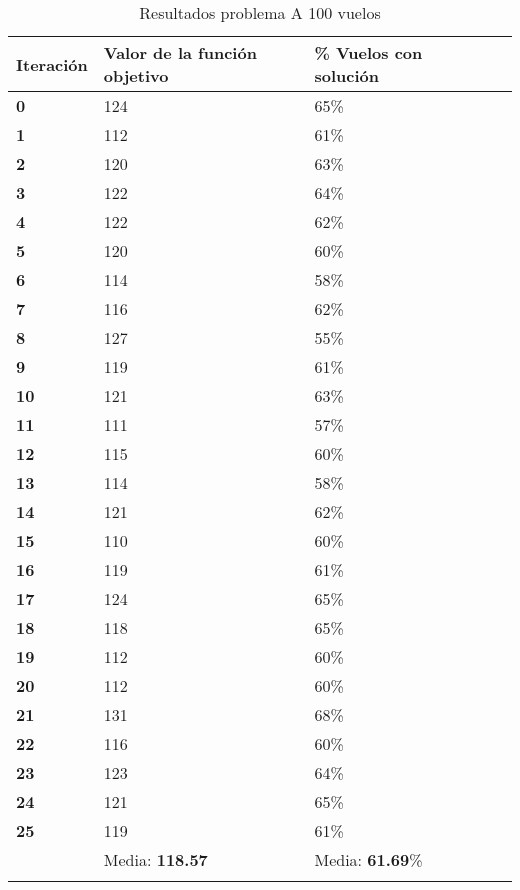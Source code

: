 \begin{longtable}{| p{} | p{} |  p{} | p{}  | p{} | }
	\hline
	\textbf{Iteración} & \textbf{Valor de la función objetivo} &\textbf{\% Vuelos con solución} \\ \hline
	\textbf{0} &124  &65\%  \\ \hline
	\textbf{1} &112  &61\%  \\ \hline
	\textbf{2} &120  &63\%  \\ \hline
	\textbf{3} &122  &64\%  \\ \hline
	\textbf{4} &122  &62\%  \\ \hline
	\textbf{5} &120  &60\%  \\ \hline
	\textbf{6} &114  &58\%  \\ \hline
	\textbf{7} &116  &62\%  \\ \hline
	\textbf{8} &127  &55\%  \\ \hline
	\textbf{9} &119  &61\%  \\ \hline
	\textbf{10} &121  &63\%  \\ \hline
	\textbf{11} &111  &57\%  \\ \hline
	\textbf{12} &115  &60\%  \\ \hline
	\textbf{13} &114  &58\%  \\ \hline
	\textbf{14} &121  &62\%  \\ \hline
	\textbf{15} &110  &60\%  \\ \hline
	\textbf{16} &119  &61\%  \\ \hline
	\textbf{17} &124  &65\%  \\ \hline
	\textbf{18} &118  &65\%  \\ \hline
	\textbf{19} &112  &60\%  \\ \hline
	\textbf{20} &112  &60\%  \\ \hline
	\textbf{21} &131  &68\%  \\ \hline
	\textbf{22} &116  &60\%  \\ \hline
	\textbf{23} &123  &64\%  \\ \hline
	\textbf{24} &121  &65\%  \\ \hline
	\textbf{25} &119  &61\%  \\ \hline
				&Media: \textbf{118.57}  &Media: \textbf{61.69}\%  \\ \hline

	\caption{Resultados problema A 100 vuelos } %
	\label{tab: Resultados problema A 100 vuelos}

	
\end{longtable}


